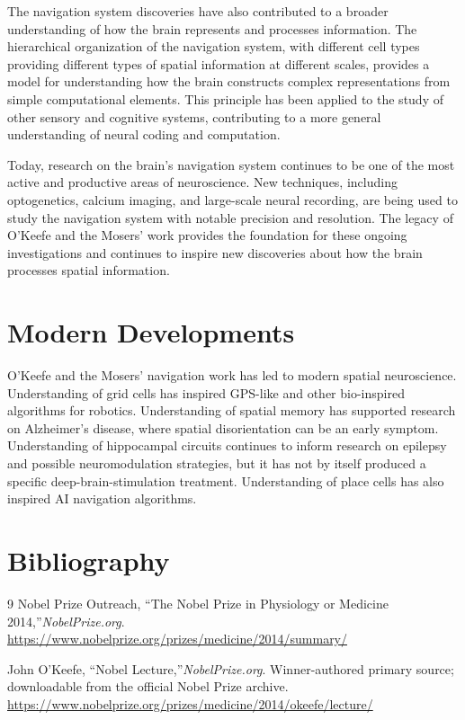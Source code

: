 The navigation system discoveries have also contributed to a broader understanding of how the brain represents and processes information. The hierarchical organization of the navigation system, with different cell types providing different types of spatial information at different scales, provides a model for understanding how the brain constructs complex representations from simple computational elements. This principle has been applied to the study of other sensory and cognitive systems, contributing to a more general understanding of neural coding and computation.

Today, research on the brain's navigation system continues to be one of the most active and productive areas of neuroscience. New techniques, including optogenetics, calcium imaging, and large-scale neural recording, are being used to study the navigation system with notable precision and resolution. The legacy of O'Keefe and the Mosers' work provides the foundation for these ongoing investigations and continues to inspire new discoveries about how the brain processes spatial information.


\section{Modern Developments}

O'Keefe and the Mosers' navigation work has led to modern spatial neuroscience. Understanding of grid cells has inspired GPS-like and other bio-inspired algorithms for robotics. Understanding of spatial memory has supported research on Alzheimer's disease, where spatial disorientation can be an early symptom. Understanding of hippocampal circuits continues to inform research on epilepsy and possible neuromodulation strategies, but it has not by itself produced a specific deep-brain-stimulation treatment. Understanding of place cells has also inspired AI navigation algorithms.


\section{Bibliography}

\begin{thebibliography}{9}
Nobel Prize Outreach, ``The Nobel Prize in Physiology or Medicine 2014,''\emph{NobelPrize.org}.\\
\url{https://www.nobelprize.org/prizes/medicine/2014/summary/}

John O'Keefe, ``Nobel Lecture,''\emph{NobelPrize.org}. Winner-authored primary source; downloadable from the official Nobel Prize archive.\\
\url{https://www.nobelprize.org/prizes/medicine/2014/okeefe/lecture/}
\end{thebibliography}
